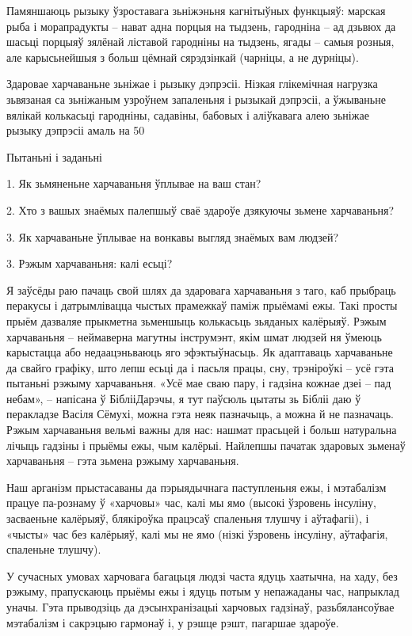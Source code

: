 Памяншаюць рызыку ўзроставага зьніжэньня кагнітыўных функцыяў: марская рыба і морапрадукты – нават адна порцыя на тыдзень, гародніна – ад дзьвюх да шасьці порцыяў зялёнай ліставой гародніны на тыдзень, ягады – самыя розныя, але карысьнейшыя з больш цёмнай сярэдзінкай (чарніцы, а не дурніцы).

Здаровае харчаваньне зьніжае і рызыку дэпрэсіі. Нізкая глікемічная нагрузка зьвязаная са зьніжаным узроўнем запаленьня і рызыкай дэпрэсіі, а ўжываньне вялікай колькасьці гародніны, садавіны, бабовых і аліўкавага алею зьніжае рызыку дэпрэсіі амаль на 50%

Пытаньні і заданьні

1. Як зьмяненьне харчаваньня ўплывае на ваш стан?

2. Хто з вашых знаёмых палепшыў сваё здароўе дзякуючы зьмене харчаваньня?

3. Як харчаваньне ўплывае на вонкавы выгляд знаёмых вам людзей?


3. Рэжым харчаваньня: калі есьці?

Я заўсёды раю пачаць свой шлях да здаровага харчаваньня з таго, каб прыбраць перакусы і датрымлівацца чыстых прамежкаў паміж прыёмамі ежы. Такі просты прыём дазваляе прыкметна зьменшыць колькасьць зьяданых калёрыяў. Рэжым харчаваньня – неймаверна магутны інструмэнт, якім шмат людзей ня ўмеюць карыстацца або недаацэньваюць яго эфэктыўнасьць. Як адаптаваць харчаваньне да свайго графіку, што лепш есьці да і пасьля працы, сну, трэніроўкі – усё гэта пытаньні рэжыму харчаваньня. «Усё мае сваю пару, і гадзіна кожнае дзеі – пад небам», – напісана ў БіблііДарэчы, я тут паўсюль цытаты зь Бібліі даю ў перакладзе Васіля Сёмухі, можна гэта неяк пазначыць, а можна й не пазначаць. Рэжым харчаваньня вельмі важны для нас: нашмат прасьцей і больш натуральна лічыць гадзіны і прыёмы ежы, чым калёрыі. Найлепшы пачатак здаровых зьменаў харчаваньня – гэта зьмена рэжыму харчаваньня.

Наш арганізм прыстасаваны да пэрыядычнага паступленьня ежы, і мэтабалізм працуе па-рознаму ў «харчовы» час, калі мы ямо (высокі ўзровень інсуліну, засваеньне калёрыяў, блякіроўка працэсаў спаленьня тлушчу і аўтафагіі), і «чысты» час без калёрыяў, калі мы не ямо (нізкі ўзровень інсуліну, аўтафагія, спаленьне тлушчу).

У сучасных умовах харчовага багацьця людзі часта ядуць хаатычна, на хаду, без рэжыму, прапускаюць прыёмы ежы і ядуць потым у непажаданы час, напрыклад уначы. Гэта прыводзіць да дэсынхранізацыі харчовых гадзінаў, разьбялансоўвае мэтабалізм і сакрэцыю гармонаў і, у рэшце рэшт, пагаршае здароўе.

